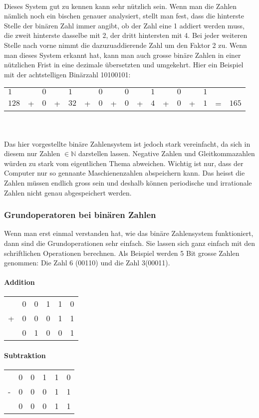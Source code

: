 \\
Dieses System gut zu kennen kann sehr nützlich sein. Wenn man die Zahlen nämlich noch ein bischen genauer analysiert, stellt man fest, dass  die hinterste Stelle der binären Zahl immer angibt, ob der Zahl eine 1 addiert werden muss, die zweit hinterste dasselbe mit 2, der dritt hintersten mit 4. Bei jeder weiteren Stelle nach vorne nimmt die dazuzuaddierende Zahl um den Faktor 2 zu. Wenn man dieses System erkannt hat, kann man auch grosse binäre Zahlen in einer nützlichen Frist in eine dezimale übersetzten und umgekehrt. Hier ein Beispiel mit der achtstelligen Binärzahl 10100101:
\\
\begin{tabular}{l l l l l l l l l l l l l l l l l}
$1$ & & $0$ & &  $1$ & & $0$ & & $0$ & & $1$ & & $0$ & & $1$ & & \\
$ 128 $ &+& $0$ &+& $ 32$ &+& $0$ &+& $0$ &+& $ 4$ &+& $0$ &+& $1$ &=& $165$ \\ 
\end{tabular} \\
\\
Das hier vorgestellte binäre Zahlensystem ist jedoch stark vereinfacht, da sich in diesem nur Zahlen $\in \mathbb{N} $ darstellen lassen. Negative Zahlen und Gleitkommazahlen würden zu stark vom eigentlichen Thema abweichen. Wichtig ist nur, dass der Computer nur so gennante Maschienenzahlen abspeichern kann. Das heisst die Zahlen müssen endlich gross sein und deshalb können periodische und irrationale Zahlen nicht genau abgespeichert werden.
\subsubsection{Grundoperatoren bei binären Zahlen}
Wenn man erst einmal verstanden hat, wie das binäre Zahlensystem funktioniert, dann sind die Grundoperationen sehr einfach. Sie lassen sich ganz einfach mit den schriftlichen Operationen berechnen. Als Beispiel werden 5 Bit grosse Zahlen genommen: Die Zahl 6 (00110) und die Zahl 3(00011).
\paragraph{Addition}
\begin{tabular}{llllll}
&0&0&1&1&0 \\
+&0&0&0&1&1 \\ \hline
&0&1&0&0&1
\end{tabular}
\paragraph{Subtraktion}
\begin{tabular}{llllll}
&0&0&1&1&0 \\
-&0&0&0&1&1 \\ \hline
&0&0&0&1&1
\end{tabular}
